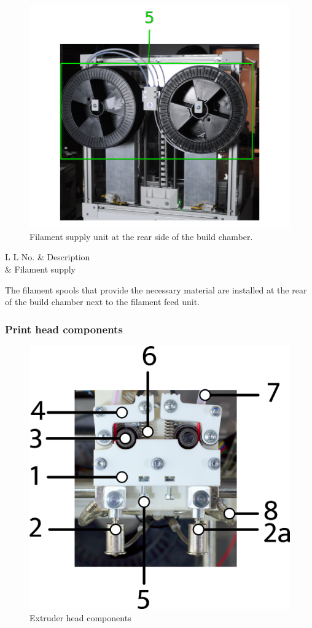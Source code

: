 \begin{figure}[H]
  \centering
  \includegraphics[width=.7\linewidth]{./img/desc_buildchamber_backview.png}
  \caption{Filament supply unit at the rear side of the build chamber.}
\end{figure}

\begin{table}[H]
  \centering
  \begin{tabulary}{\textwidth}{ L L }
    \toprule
    No.  & 	Description \\
      &	Filament supply \\
    \bottomrule
  \end{tabulary}
\end{table}

The filament spools that provide the necessary material are installed at the rear of the build chamber next to the filament feed unit.

\subsubsection{Print head components}

\begin{figure}[H]
  \centering
  \includegraphics[width=.7\linewidth]{./img/desc_extruderhead.png}
  \caption{Extruder head components}
\end{figure}

